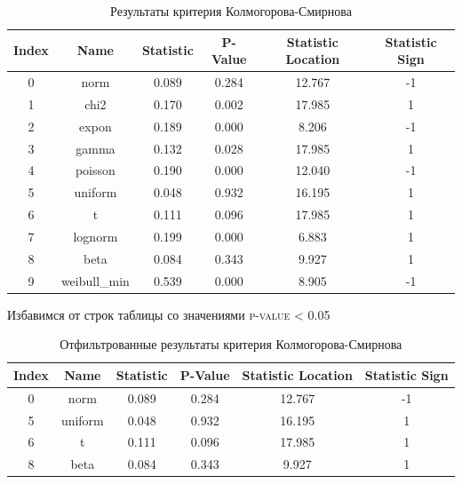 \documentclass[a4paper, 14pt]{extarticle}
\begin{document}
\begin{table}[h!]
    \centering
    \renewcommand{\arraystretch}{1.5}
    \begin{adjustbox}{max width=0.8\textwidth}
        \begin{tabular}{|c|c|c|c|c|c|}
        \hline
        \textbf{Index} & \textbf{Name} & \textbf{Statistic} & \textbf{P-Value} & \textbf{Statistic Location} & \textbf{Statistic Sign} \\
        \hline
        0 & norm & 0.089 & 0.284 & 12.767 & -1 \\
        \hline
        1 & chi2 & 0.170 & 0.002 & 17.985 & 1 \\
        \hline
        2 & expon & 0.189 & 0.000 & 8.206 & -1 \\
        \hline
        3 & gamma & 0.132 & 0.028 & 17.985 & 1 \\
        \hline
        4 & poisson & 0.190 & 0.000 & 12.040 & -1 \\
        \hline
        5 & uniform & 0.048 & 0.932 & 16.195 & 1 \\
        \hline
        6 & t & 0.111 & 0.096 & 17.985 & 1 \\
        \hline
        7 & lognorm & 0.199 & 0.000 & 6.883 & 1 \\
        \hline
        8 & beta & 0.084 & 0.343 & 9.927 & 1 \\
        \hline
        9 & weibull\_min & 0.539 & 0.000 & 8.905 & -1 \\
        \hline
        \end{tabular}
    \end{adjustbox}
    \caption{Результаты критерия Колмогорова-Смирнова}
    \label{tab:statistical_data1}
\end{table}

\vspace{20pt}


Избавимся от строк таблицы со значениями \textsc{p-value} < 0.05

\begin{table}[h!]
    \centering
    \renewcommand{\arraystretch}{1.5}
    \begin{adjustbox}{max width=0.8\textwidth}
        \begin{tabular}{|c|c|c|c|c|c|}
        \hline
        \textbf{Index} & \textbf{Name} & \textbf{Statistic} & \textbf{P-Value} & \textbf{Statistic Location} & \textbf{Statistic Sign} \\
        \hline
        0 & norm & 0.089 & 0.284 & 12.767 & -1 \\
        \hline
        5 & uniform & 0.048 & 0.932 & 16.195 & 1 \\
        \hline
        6 & t & 0.111 & 0.096 & 17.985 & 1 \\
        \hline
        8 & beta & 0.084 & 0.343 & 9.927 & 1 \\
        \hline
        \end{tabular}
    \end{adjustbox}
    \caption{Отфильтрованные результаты критерия Колмогорова-Смирнова}
    \label{tab:statistical_data2}
\end{table}
\end{document}
